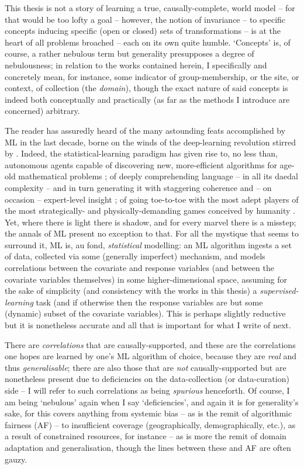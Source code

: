 %
This thesis is not a story of learning a true, causally-complete, world model -- for that would be
too lofty a goal -- however, the notion of invariance -- to specific concepts inducing specific
(open or closed) sets of transformations -- is at the heart of all problems broached -- each on
its own quite humble.
%
`Concepts' is, of course, a rather nebulous term but generality presupposes a degree of
nebulousness; in relation to the works contained herein, I specifically and concretely mean, for
instance, some indicator of group-membership, or the site, or context, of collection (the
\emph{domain}), though the exact nature of said concepts is indeed both conceptually and
practically (as far as the methods I introduce are concerned) arbitrary.
%

The reader has assuredly heard of the many astounding feats accomplished by ML in the last decade,
borne on the winds of the deep-learning revolution stirred by \cite{krizhevsky2012imagenet}.
%
Indeed, the statistical-learning paradigm has given rise to, no less than, autonomous agents
capable of discovering new, more-efficient algorithms for age-old mathematical problems
\citep{fawzi2022discovering}; of deeply comprehending language -- in all its daedal complexity --
and in turn generating it with staggering coherence and -- on occasion -- expert-level insight
\citep{brown2020language}; of going toe-to-toe with the most adept players of the most
strategically- and physically-demanding games conceived by humanity
\citep{silver2017mastering,vinyals2019grandmaster,meta2022human}.
%
Yet, where there is light there is shadow, and for every marvel there is a misstep; the annals of
ML present no exception to that.
%
For all the mystique that seems to surround it, ML is, au fond, \emph{statistical} modelling: an ML
algorithm ingests a set of data, collected via some (generally imperfect) mechanism, and models
correlations between the covariate and response variables (and between the covariate variables
themselves) in some higher-dimensional space, assuming for the sake of simplicity (and consistency
with the works in this thesis) a \emph{supervised-learning} task (and if otherwise then the response
variables are but some (dynamic) subset of the covariate variables).
%
This is perhaps slightly reductive but it is nonetheless accurate and all that is important for what
I write of next.

%
There are \emph{correlations} that are causally-supported, and these are the correlations one hopes
are learned by one's ML algorithm of choice, because they are \emph{real} and thus
\emph{generalisable}; there are also those that are \emph{not} causally-supported but are
nonetheless present due to deficiencies on the data-collection (or data-curation) side -- I will
refer to such correlations as being \emph{spurious} henceforth.
%
Of course, I am being `nebulous' again when I say `deficiencies', and again it is for generality's
sake, for this covers anything from systemic bias -- as is the remit of algorithmic fairness (AF)
-- to insufficient coverage (geographically, demographically, etc.), as a result of constrained
resources, for instance -- as is more the remit of domain adaptation and generalisation, though the
lines between these and AF are often gauzy.


